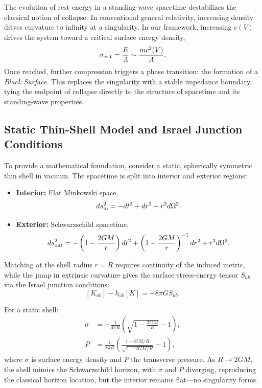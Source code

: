 \documentclass[12pt]{article}
\begin{document}
The evolution of rest energy in a standing-wave spacetime destabilizes the classical notion of collapse. In conventional general relativity, increasing density drives curvature to infinity at a singularity. In our framework, increasing \(c(V)\) drives the system toward a critical surface energy density,
\begin{equation}
\sigma_{\rm crit} = \frac{E}{A} \sim \frac{m c^2(V)}{A}.
\end{equation}
Once reached, further compression triggers a phase transition: the formation of a \emph{Black Surface}. This replaces the singularity with a stable impedance boundary, tying the endpoint of collapse directly to the structure of spacetime and its standing-wave properties.

\subsection{Static Thin-Shell Model and Israel Junction Conditions}

To provide a mathematical foundation, consider a static, spherically symmetric thin shell in vacuum. The spacetime is split into interior and exterior regions:
\begin{itemize}
    \item \textbf{Interior:} Flat Minkowski space,
    \[ 
    ds^2_{\rm in} = -dt^2 + dr^2 + r^2 d\Omega^2.
    \]
    \item \textbf{Exterior:} Schwarzschild spacetime,
    \[
    ds^2_{\rm out} = -\left(1 - \frac{2GM}{r}\right) dt^2 + \left(1 - \frac{2GM}{r}\right)^{-1} dr^2 + r^2 d\Omega^2.
    \]
\end{itemize}

Matching at the shell radius \(r=R\) requires continuity of the induced metric, while the jump in extrinsic curvature gives the surface stress-energy tensor \(S_{ab}\) via the Israel junction conditions:
\[
[K_{ab}] - h_{ab}[K] = -8\pi G S_{ab}.
\]

For a static shell:
\begin{align*}
\sigma &= -\frac{1}{4\pi R} \left( \sqrt{1 - \frac{2GM}{R}} - 1 \right),\\
P &= \frac{1}{8\pi R} \left( \frac{1 - GM/R}{\sqrt{1 - 2GM/R}} - 1 \right),
\end{align*}
where \(\sigma\) is surface energy density and \(P\) the transverse pressure. As \(R \to 2GM\),  the shell mimics the Schwarzschild horizon, with \(\sigma\) and \(P\) diverging, reproducing the classical horizon location, but the interior remains flat---no singularity forms.
\end{document}
